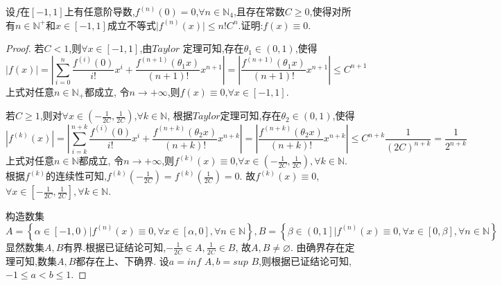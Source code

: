 \documentclass[lang=cn,newtx,10pt,scheme=chinese]{../Template/elegantbook}
\begin{document}
\begin{exercise}
    设\(f\)在\([-1,1]\)上有任意阶导数,\(f^{(n)}(0)=0\),\(\forall n\in\mathbb{N}_4\),且存在常数\(C\geqslant 0\),使得对所有\(n\in\mathbb{N}^+\)和\(x\in[-1,1]\)成立不等式\(\vert f^{(n)}(x)\vert\leqslant  n!C^{n}\).证明:\(f(x)\equiv0\).
    \begin{proof}
        若$C<1$,则$\forall x\in[-1,1]$,由$Taylor$ 定理可知,存在$\theta_1\in(0,1)$,使得
        \begin{equation}
            \left| f\left( x \right) \right|=\left| \sum_{i=0}^n{\frac{f^{\left( i \right)}\left( 0 \right)}{i!}x^i}+\frac{f^{\left( n+1 \right)}\left( \theta_1 x \right)}{\left( n+1 \right) !}x^{n+1} \right|=\left| \frac{f^{\left( n+1 \right)}\left( \theta_1 x \right)}{\left( n+1 \right) !}x^{n+1} \right|\leqslant C^{n+1}
            \nonumber
        \end{equation}
        上式对任意$n\in\mathbb{N} _+$都成立,
        令$n \to +\infty$,则$f(x)\equiv0$,$\forall x\in[-1,1]$.

        若$C\geqslant 1$,则对$\forall x\in(-\frac{1}{2C},\frac{1}{2C})$,$\forall k\in \mathbb{N}$,
        根据$Taylor$定理可知,存在$\theta_2\in(0,1)$,使得
        \begin{equation}
            \left| f^{\left( k \right)}\left( x \right) \right|=\left| \sum_{i=k}^{n+k}{\frac{f^{\left( i \right)}\left( 0 \right)}{i!}x^i}+\frac{f^{\left( n+k \right)}\left( \theta_2 x \right)}{\left( n+k \right) !}x^{n+k} \right|=\left| \frac{f^{\left( n+k \right)}\left( \theta_2 x \right)}{\left( n+k \right) !}x^{n+k} \right|\leqslant C^{n+k}\frac{1}{\left( 2C \right) ^{n+k}}=\frac{1}{2^{n+k}}
            \nonumber
        \end{equation}
        上式对任意$n\in\mathbb{N}$都成立,
        令$n\to+\infty$,则$f^{(k)}(x)\equiv0$,$\forall x\in(-\frac{1}{2C},\frac{1}{2C}),\forall k\in \mathbb{N}$.
        根据$f^{(k)}$的连续性可知,$f^{(k)}(-\frac{1}{2C})=f^{(k)}(\frac{1}{2C})=0$.
        故$f^{(k)}(x)\equiv0$,$\forall x\in[-\frac{1}{2C},\frac{1}{2C}],\forall k\in \mathbb{N}$.

        构造数集
        \begin{equation}
            A=\left\{ \alpha \in \left[ -1,0 \right) |f^{\left( n \right)}\left( x \right) \equiv 0,\forall x\in \left[ \alpha ,0 \right] ,\forall n\in \mathbb{N} \right\} ,B=\left\{ \beta \in \left( 0,1 \right] |f^{\left( n \right)}\left( x \right) \equiv 0,\forall x\in \left[ 0,\beta \right] ,\forall n\in \mathbb{N} \right\} 
            \nonumber
        \end{equation}
        显然数集$A,B$有界.根据已证结论可知,$-\frac{1}{2C}\in A,\frac{1}{2C}\in B$,
        故$A,B\ne \varnothing$.
        由确界存在定理可知,数集$A,B$都存在上、下确界.
        设$a=inf\,\,A,b=sup\,\,B$,则根据已证结论可知,$-1\leqslant a<b\leqslant 1$.
        

\end{proof}
\end{exercise}
\end{document}
